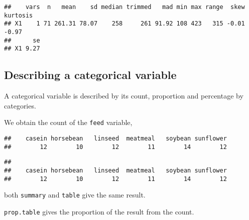 \documentclass[]{book}
\newenvironment{Shaded}{\begin{snugshade}}{\end{snugshade}}
\newcommand{\KeywordTok}[1]{\textcolor[rgb]{0.13,0.29,0.53}{\textbf{{#1}}}}
\newcommand{\NormalTok}[1]{{#1}}
\theoremstyle{definition}
\theoremstyle{definition}
\theoremstyle{remark}
\begin{document}
\begin{verbatim}
##    vars  n   mean    sd median trimmed   mad min max range  skew kurtosis
## X1    1 71 261.31 78.07    258     261 91.92 108 423   315 -0.01    -0.97
##      se
## X1 9.27
\end{verbatim}

\subsection{Describing a categorical
variable}\label{describing-a-categorical-variable}

A categorical variable is described by its count, proportion and
percentage by categories.

We obtain the count of the \texttt{feed} variable,

\begin{Shaded}
\end{Shaded}

\begin{verbatim}
##    casein horsebean   linseed  meatmeal   soybean sunflower 
##        12        10        12        11        14        12
\end{verbatim}

\begin{Shaded}
\end{Shaded}

\begin{verbatim}
## 
##    casein horsebean   linseed  meatmeal   soybean sunflower 
##        12        10        12        11        14        12
\end{verbatim}

both \texttt{summary} and \texttt{table} give the same result.

\texttt{prop.table} gives the proportion of the result from the count.

\begin{Shaded}
\end{Shaded}
\end{document}
